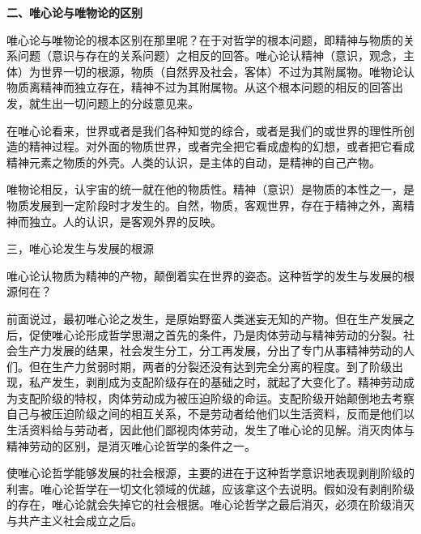 \textbf{二、唯心论与唯物论的区别}

唯心论与唯物论的根本区别在那里呢？在于对哲学的根本问题，即精神与物质的关系问题（意识与存在的关系问题）之相反的回答。唯心论认精神（意识，观念，主体）为世界一切的根源，物质（自然界及社会，客体）不过为其附属物。唯物论认物质离精神而独立存在，精神不过为其附属物。从这个根本问题的相反的回答出发，就生出一切问题上的分歧意见来。

在唯心论看来，世界或者是我们各种知觉的综合，或者是我们的或世界的理性所创造的精神过程。对外面的物质世界，或者完全把它看成虚构的幻想，或者把它看成精神元素之物质的外壳。人类的认识，是主体的自动，是精神的自己产物。

唯物论相反，认宇宙的统一就在他的物质性。精神（意识）是物质的本性之一，是物质发展到一定阶段时才发生的。自然，物质，客观世界，存在于精神之外，离精神而独立。人的认识，是客观外界的反映。

三，唯心论发生与发展的根源

唯心论认物质为精神的产物，颠倒着实在世界的姿态。这种哲学的发生与发展的根源何在？

前面说过，最初唯心论之发生，是原始野蛮人类迷妄无知的产物。但在生产发展之后，促使唯心论形成哲学思潮之首先的条件，乃是肉体劳动与精神劳动的分裂。社会生产力发展的结果，社会发生分工，分工再发展，分出了专门从事精神劳动的人们。但在生产力贫弱时期，两者的分裂还没有达到完全分离的程度。到了阶级出现，私产发生，剥削成为支配阶级存在的基础之时，就起了大变化了。精神劳动成为支配阶级的特权，肉体劳动成为被压迫阶级的命运。支配阶级开始颠倒地去考察自己与被压迫阶级之间的相互关系，不是劳动者给他们以生活资料，反而是他们以生活资料给与劳动者，因此他们鄙视肉体劳动，发生了唯心论的见解。消灭肉体与精神劳动的区别，是消灭唯心论哲学的条件之一。

使唯心论哲学能够发展的社会根源，主要的进在于这种哲学意识地表现剥削阶级的利害。唯心论哲学在一切文化领域的优越，应该拿这个去说明。假如没有剥削阶级的存在，唯心论就会失掉它的社会根据。唯心论哲学之最后消灭，必须在阶级消灭与共产主义社会成立之后。

